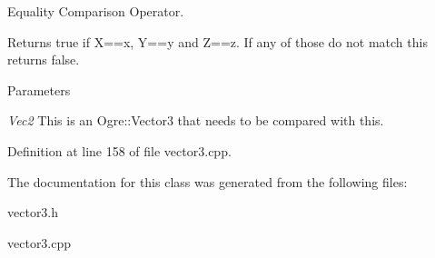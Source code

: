 Equality Comparison Operator. 

Returns true if X==x, Y==y and Z==z. If any of those do not match this returns false. 
\begin{DoxyParams}{Parameters}
\item[{\em Vec2}]This is an Ogre::Vector3 that needs to be compared with this. \end{DoxyParams}


Definition at line 158 of file vector3.cpp.



The documentation for this class was generated from the following files:\begin{DoxyCompactItemize}
\item 
vector3.h\item 
vector3.cpp\end{DoxyCompactItemize}
